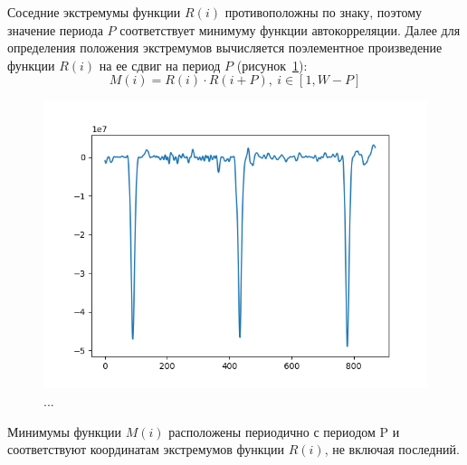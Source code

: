 \documentclass[12pt,a4paper]{article}
\begin{document}
Соседние экстремумы функции $R(i)$ противоположны по знаку, поэтому значение периода $P$ соответствует минимуму функции автокорреляции.
Далее для определения положения экстремумов вычисляется поэлементное произведение функции $R(i)$ на ее сдвиг на период $P$ (рисунок~\ref{fig:correlation_row}):
$$M(i)= R(i)\cdot R(i+P),\ i\in[1, W-P]$$
\begin{figure}[h]
	
	\centering
	
	\includegraphics[width=1\linewidth]{correlation_row.png}
	
	\caption{...}
	
	\label{fig:correlation_row}
	
\end{figure}
Минимумы функции $M(i)$ расположены периодично с периодом P и соответствуют координатам экстремумов функции $R(i)$, не включая последний.
 
\end{document}
